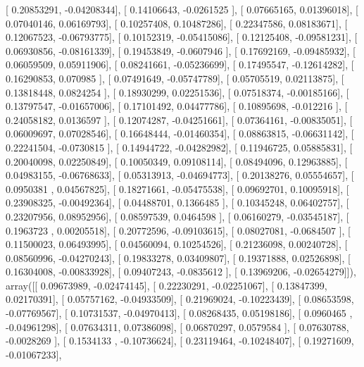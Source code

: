 \documentclass{article}
\begin{document}
       [ 0.20853291, -0.04208344],
       [ 0.14106643, -0.0261525 ],
       [ 0.07665165,  0.01396018],
       [ 0.07040146,  0.06169793],
       [ 0.10257408,  0.10487286],
       [ 0.22347586,  0.08183671],
       [ 0.12067523, -0.06793775],
       [ 0.10152319, -0.05415086],
       [ 0.12125408, -0.09581231],
       [ 0.06930856, -0.08161339],
       [ 0.19453849, -0.0607946 ],
       [ 0.17692169, -0.09485932],
       [ 0.06059509,  0.05911906],
       [ 0.08241661, -0.05236699],
       [ 0.17495547, -0.12614282],
       [ 0.16290853,  0.070985  ],
       [ 0.07491649, -0.05747789],
       [ 0.05705519,  0.02113875],
       [ 0.13818448,  0.0824254 ],
       [ 0.18930299,  0.02251536],
       [ 0.07518374, -0.00185166],
       [ 0.13797547, -0.01657006],
       [ 0.17101492,  0.04477786],
       [ 0.10895698, -0.012216  ],
       [ 0.24058182,  0.0136597 ],
       [ 0.12074287, -0.04251661],
       [ 0.07364161, -0.00835051],
       [ 0.06009697,  0.07028546],
       [ 0.16648444, -0.01460354],
       [ 0.08863815, -0.06631142],
       [ 0.22241504, -0.0730815 ],
       [ 0.14944722, -0.04282982],
       [ 0.11946725,  0.05885831],
       [ 0.20040098,  0.02250849],
       [ 0.10050349,  0.09108114],
       [ 0.08494096,  0.12963885],
       [ 0.04983155, -0.06768633],
       [ 0.05313913, -0.04694773],
       [ 0.20138276,  0.05554657],
       [ 0.0950381 ,  0.04567825],
       [ 0.18271661, -0.05475538],
       [ 0.09692701,  0.10095918],
       [ 0.23908325, -0.00492364],
       [ 0.04488701,  0.1366485 ],
       [ 0.10345248,  0.06402757],
       [ 0.23207956,  0.08952956],
       [ 0.08597539,  0.0464598 ],
       [ 0.06160279, -0.03545187],
       [ 0.1963723 ,  0.00205518],
       [ 0.20772596, -0.09103615],
       [ 0.08027081, -0.0684507 ],
       [ 0.11500023,  0.06493995],
       [ 0.04560094,  0.10254526],
       [ 0.21236098,  0.00240728],
       [ 0.08560996, -0.04270243],
       [ 0.19833278,  0.03409807],
       [ 0.19371888,  0.02526898],
       [ 0.16304008, -0.00833928],
       [ 0.09407243, -0.0835612 ],
       [ 0.13969206, -0.02654279]]), array([[ 0.09673989, -0.02474145],
       [ 0.22230291, -0.02251067],
       [ 0.13847399,  0.02170391],
       [ 0.05757162, -0.04933509],
       [ 0.21969024, -0.10223439],
       [ 0.08653598, -0.07769567],
       [ 0.10731537, -0.04970413],
       [ 0.08268435,  0.05198186],
       [ 0.0960465 , -0.04961298],
       [ 0.07634311,  0.07386098],
       [ 0.06870297,  0.0579584 ],
       [ 0.07630788, -0.0028269 ],
       [ 0.1534133 , -0.10736624],
       [ 0.23119464, -0.10248407],
       [ 0.19271609, -0.01067233],
\end{document}
